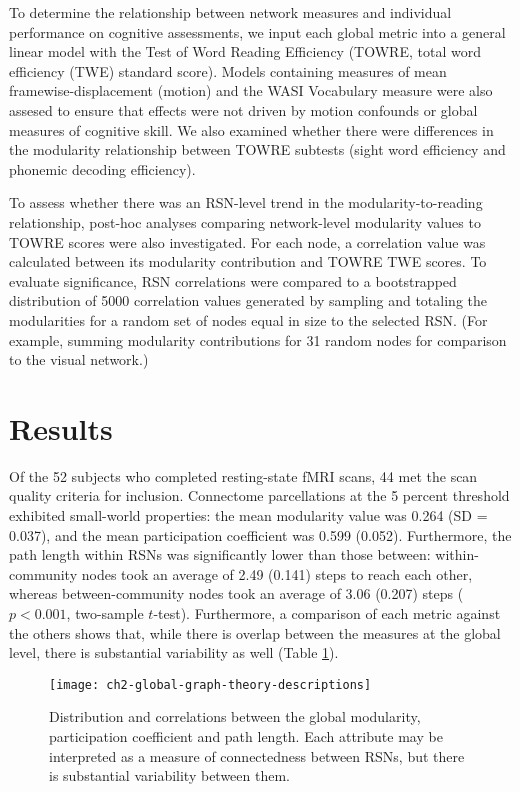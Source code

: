 To determine the relationship between network measures and individual performance on cognitive assessments, we input each global metric into a general linear model with the Test of Word Reading Efficiency (TOWRE, total word efficiency (TWE) standard score). Models containing measures of mean framewise-displacement (motion) and the WASI Vocabulary measure were also assesed to ensure that effects were not driven by motion confounds or global measures of cognitive skill. We also examined whether there were differences in the modularity relationship between TOWRE subtests (sight word efficiency  and phonemic decoding efficiency). 

To assess whether there was an RSN-level trend in the modularity-to-reading relationship, post-hoc analyses comparing network-level modularity values to TOWRE scores were also investigated. For each node, a correlation value was calculated between its modularity contribution and TOWRE TWE scores. To evaluate significance, RSN correlations were compared to a bootstrapped distribution of 5000 correlation values generated by sampling and totaling the modularities for a random set of nodes equal in size to the selected RSN. (For example, summing modularity contributions for 31 random nodes for comparison to the visual network.)


\section{Results} 

Of the 52 subjects who completed resting-state fMRI scans, 44 met the scan quality criteria for inclusion. Connectome parcellations at the 5 percent threshold exhibited small-world properties: the mean modularity value was 0.264 (SD = 0.037), and the mean participation coefficient was 0.599 (0.052). Furthermore, the path length within RSNs was significantly lower than those between: within-community nodes took an average of 2.49 (0.141) steps to reach each other, whereas between-community nodes took an average of 3.06 (0.207) steps ($p < 0.001$, two-sample $t$-test). Furthermore, a comparison of each metric against the others shows that, while there is overlap between the measures at the global level, there is substantial variability as well (Table \ref{fig:ch2-global-graph-theory-descriptions}).

\begin{figure}[t!]
    \centering
    \texttt{[image: ch2-global-graph-theory-descriptions]}
    \caption[Distribution and correlations between global graph theory measures]{Distribution and correlations between the global modularity, participation coefficient and path length. Each attribute may be interpreted as a measure of connectedness between RSNs, but there is substantial variability between them.}
    \label{fig:ch2-global-graph-theory-descriptions}
\end{figure}

